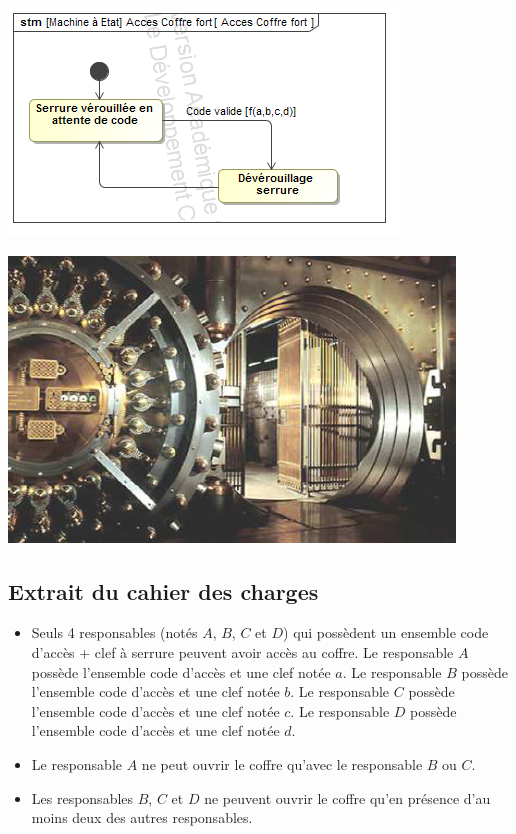 \documentclass[10pt]{article}
\begin{document}
\begin{minipage}[c]{.45\linewidth}
\begin{center}
\includegraphics[width=\textwidth]{images/acces}
\end{center}
\end{minipage}
\hfill
\begin{minipage}[c]{.45\linewidth}
\begin{center}
\includegraphics[width=.9\textwidth]{images/fig3}
\end{center}
\end{minipage}

\vspace{.25cm} 

\subsection*{Extrait du cahier des charges}
\begin{itemize}
\item Seuls 4 responsables (notés $A$, $B$, $C$ et $D$) qui possèdent un ensemble code d'accès + clef à serrure peuvent avoir accès au coffre. Le responsable $A$ possède l'ensemble code d'accès et une clef notée $a$. Le responsable $B$ possède l'ensemble code d'accès et une clef notée $b$. Le responsable $C$ possède l'ensemble code d'accès et une clef notée $c$. Le responsable $D$ possède l'ensemble code d'accès et une clef notée $d$.
\item Le responsable $A$ ne peut ouvrir le coffre qu'avec le responsable $B$ ou $C$.
\item Les responsables $B$, $C$ et $D$ ne peuvent ouvrir le coffre qu'en présence d'au moins deux des autres responsables.
\end{itemize}
\end{document}
